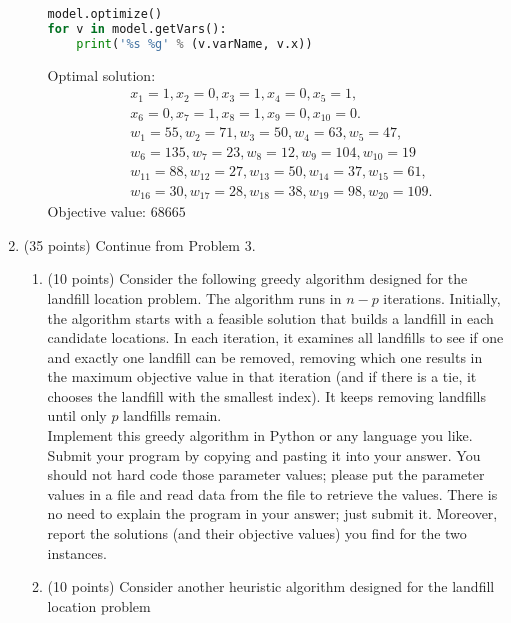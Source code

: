 \documentclass[12pt]{article}
\begin{document}
\begin{enumerate}
\begin{enumerate}
\begin{lstlisting}[language=Python]
model.optimize()
for v in model.getVars():
    print('%s %g' % (v.varName, v.x))
                        \end{lstlisting}
                        Optimal solution:
                        \begin{align*}
                               & x_1 = 1, x_2 = 0, x_3 = 1, x_4 = 0, x_5 = 1,                      \\
                               & x_6 = 0, x_7 = 1, x_8 = 1, x_9 = 0, x_{10} = 0.                   \\
                               & w_1 = 55, w_2 = 71, w_3 = 50, w_4 = 63, w_5 = 47,                 \\
                               & w_6 = 135, w_7 = 23, w_8 = 12, w_9 = 104, w_{10} = 19             \\
                               & w_{11} = 88, w_{12} = 27, w_{13} = 50, w_{14} = 37, w_{15} = 61,  \\
                               & w_{16} = 30, w_{17} = 28, w_{18} = 38, w_{19} = 98, w_{20} = 109.
                        \end{align*}
                        Objective value:  $68665$
            \end{enumerate}
      \item (35 points) Continue from Problem 3.
            \begin{enumerate}
                  \item (10 points) Consider the following greedy algorithm designed for the landfill location problem. The algorithm runs in $n - p$ iterations. Initially, the algorithm starts with a feasible solution that builds a landfill in each candidate locations. In each iteration, it examines all landfills to see if one and exactly one landfill can be removed, removing which one results in the maximum objective value in that iteration (and if there is a tie, it chooses the landfill with the smallest index). It keeps removing landfills until only $p$ landfills remain.\\
                        Implement this greedy algorithm in Python or any language you like. Submit your program by copying and pasting it into your answer. You should not hard code those parameter values; please put the parameter values in a file and read data from the file to retrieve the values. There is no need to explain the program in your answer; just submit it. Moreover, report the solutions (and their objective values) you find for the two instances.
                  \item (10 points) Consider another heuristic algorithm designed for the landfill location problem

\end{enumerate}
\end{enumerate}
\end{document}
